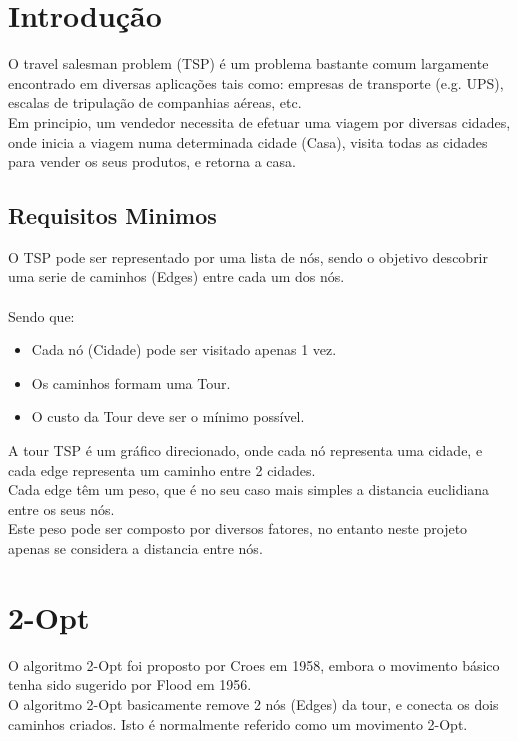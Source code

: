 \documentclass[12pt,a4paper,portrait]{article}
\begin{document}
	
	\tableofcontents
	
	
	\newpage
	\section{Introdução}
		O travel salesman problem (TSP) é um problema bastante comum largamente encontrado em diversas aplicações tais como: empresas de transporte (e.g. UPS), escalas de tripulação de companhias aéreas, etc.\\
		Em principio, um vendedor necessita de efetuar uma viagem por diversas cidades, onde inicia a viagem numa determinada cidade (Casa), visita todas as cidades para vender os seus produtos, e retorna a casa.\\
		\subsection{Requisitos Minimos}	
			O TSP pode ser representado por uma lista de nós, sendo o objetivo descobrir uma serie de caminhos (Edges) entre cada um dos nós.\\\\
			Sendo que:\\
			\begin{itemize}
				\item Cada nó (Cidade) pode ser visitado apenas 1 vez.
				\item Os caminhos formam uma Tour.
				\item O custo da Tour deve ser o mínimo possível.
			\end{itemize}
			A tour TSP é um gráfico direcionado, onde cada nó representa uma cidade, e cada edge representa um caminho entre 2 cidades.\\
			Cada edge têm um peso, que é no seu caso mais simples a distancia euclidiana entre os seus nós.\\
			Este peso pode ser composto por diversos fatores, no entanto neste projeto apenas se considera a distancia entre nós.\\ 			
			\newpage
	\section{2-Opt} \label{ssec:num1}
			O algoritmo 2-Opt foi proposto por Croes em 1958, embora o movimento básico tenha sido sugerido por Flood em 1956.\\ 
			O algoritmo 2-Opt basicamente remove 2 nós (Edges) da tour, e conecta os dois caminhos criados. Isto é normalmente referido como um movimento 2-Opt.\\
\end{document}
